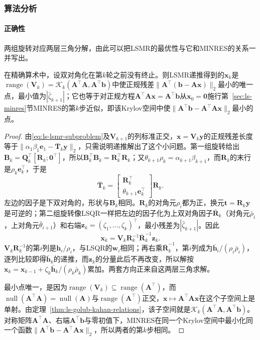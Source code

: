 \subsubsection{算法分析}

\paragraph{正确性}
两组旋转对应两层三角分解，由此可以把LSMR的最优性与它和MINRES的关系一并写出。

\begin{theorem}[LSMR的最小正规残差性及与MINRES的等价]
\label{thm:ls-lsmr-minres-equivalence}
在精确算术中，设双对角化在第$k$轮之前没有终止。则LSMR递推得到的$\bm x_k$是$\operatorname{range}(\bm V_k)=\mathcal K_k(\bm A^\top\bm A,\bm A^\top\bm b)$中使正规残差$\lVert\bm A^\top(\bm b-\bm A\bm x)\rVert_2$最小的唯一点，最小值为$|\bar\zeta_{k+1}|$；它也等于对正规方程$\bm A^\top\bm A\bm x=\bm A^\top\bm b$从$\bm x_0=\bm0$施行第~\ref{sec:ls-minres}节MINRES的第$k$步近似，即该Krylov空间中使$\lVert\bm A^\top\bm b-\bm A^\top\bm A\bm x\rVert_2$最小的点。
\end{theorem}

\begin{proof}
由\eqref{eq:ls-lsmr-subproblem}及$\bm V_{k+1}$的列标准正交，$\bm x=\bm V_k\bm y$的正规残差长度等于$\lVert\alpha_1\beta_1\bm e_1-\overline{\bm T}_k\bm y\rVert_2$，只需说明递推解出了这个小问题。第一组旋转给出$\bm B_k=\bm Q_k^\top[\bm R_k;\bm0^\top]$，所以$\bm B_k^\top\bm B_k=\bm R_k^\top\bm R_k$；又$\theta_{k+1}\rho_k=\alpha_{k+1}\beta_{k+1}$，而$\bm R_k$的末行是$\rho_k\bm e_k^\top$，于是
\[
 \overline{\bm T}_k=\begin{bmatrix}\bm R_k^\top\\ \theta_{k+1}\bm e_k^\top\end{bmatrix}\bm R_k .
\]
左边的因子是下双对角的，形状与$\bm B_k$相同。$\bm R_k$的对角元$\rho_i$都为正，换元$\bm t=\bm R_k\bm y$是可逆的；第二组旋转像LSQR一样把左边的因子化为上双对角因子$\bar{\bm R}_k$（对角元$\bar\rho_i$，上对角元$\bar\theta_{i+1}$）和右端$\bm z_k=(\zeta_1,\ldots,\zeta_k)^\top$，最小残差为$|\bar\zeta_{k+1}|$。因此
\[
 \bm x_k=\bm V_k\bm R_k^{-1}\bar{\bm R}_k^{-1}\bm z_k .
\]
$\bm V_k\bm R_k^{-1}$的第$i$列是$\bm h_i/\rho_i$，与LSQR的$\bm w_i$相同；再右乘$\bar{\bm R}_k^{-1}$，第$i$列成为$\bar{\bm h}_i/(\rho_i\bar\rho_i)$，逐列比较即得$\bar{\bm h}_k$的递推，而$\bm z_k$的分量此后不再改变，所以解按$\bm x_k=\bm x_{k-1}+\zeta_k\bar{\bm h}_k/(\rho_k\bar\rho_k)$累加。两套方向正来自这两层三角求解。

最小点唯一，是因为$\operatorname{range}(\bm V_k)\subseteq\operatorname{range}(\bm A^\top)$，而$\operatorname{null}(\bm A^\top\bm A)=\operatorname{null}(\bm A)$与$\operatorname{range}(\bm A^\top)$正交，$\bm x\mapsto\bm A^\top\bm A\bm x$在这个子空间上是单射。由定理~\ref{thm:ls-golub-kahan-relations}，该子空间就是$\mathcal K_k(\bm A^\top\bm A,\bm A^\top\bm b)$。对称矩阵$\bm A^\top\bm A$、右端$\bm A^\top\bm b$与零初值下，MINRES在同一个Krylov空间中最小化同一个函数$\lVert\bm A^\top\bm b-\bm A^\top\bm A\bm x\rVert_2$，所以两者的第$k$步相同。
\end{proof}

